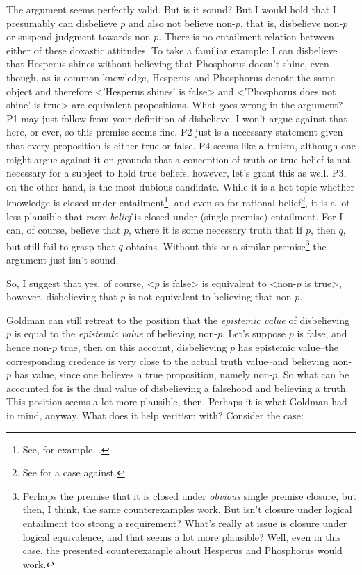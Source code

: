 \documentclass[12pt,numbers=noenddot]{scrartcl}
\begin{document}
The argument seems perfectly valid. But is it sound? But I would hold that I presumably can disbelieve $p$ and also not believe non-$p$, that is, disbelieve non-$p$ or suspend judgment towards non-$p$. There is no entailment relation between either of these doxastic attitudes. To take a familiar example: I can disbelieve that Hesperus shines without believing that Phosphorus doesn't shine, even though, as is common knowledge, Hesperus and Phosphorus denote the same object and therefore <'Hesperus shines' is false> and <'Phosphorus does not shine' is true> are equivalent propositions. What goes wrong in the argument? P1 may just follow from your definition of disbelieve. I won't argue against that here, or ever, so this premise seems fine. P2 just is a necessary statement given that every proposition is either true or false. P4 seems like a truism, although one might argue against it on grounds that a conception of truth or true belief is not necessary for a subject to hold true beliefs, however, let's grant this as well. P3, on the other hand, is the most dubious candidate. While it is a hot topic whether knowledge is closed under entailment\footnote{See, for example, \textcite{Dretske2005-DREIKC}.}, and even so for rational belief\footnote{See \textcite{KyburgJr1970-KYBC-2} for a case against.}, it is a lot less plausible that \emph{mere belief} is closed under (single premise) entailment. For I can, of course, believe that $p$, where it is some necessary truth that If $p$, then $q$, but still fail to grasp that $q$ obtains. Without this or a similar premise\footnote{Perhaps the premise that it is closed under \emph{obvious} single premise closure, but then, I think, the same counterexamples work. But isn't closure under logical entailment too strong a requirement? What's really at issue is closure under logical equivalence, and that seems a lot more plausible? Well, even in this case, the presented counterexample about Hesperus and Phosphorus would work.} the argument just isn't sound.

So, I suggest that yes, of course, <$p$ is false> is equivalent to <non-$p$ is true>, however, disbelieving that $p$ is not equivalent to believing that non-$p$.

Goldman can still retreat to the position that the \emph{epistemic value} of disbelieving $p$ is equal to the \emph{epistemic value} of believing non-$p$. Let's suppose $p$ is false, and hence non-$p$ true, then on this account, disbelieving $p$ has epistemic value–the corresponding credence is very close to the actual truth value–and believing non-$p$ has value, since one believes a true proposition, namely non-$p$. So what can be accounted for is the dual value of disbelieving a falsehood and believing a truth. This position seems a lot more plausible, then. Perhaps it is what Goldman had in mind, anyway. What does it help veritism with? Consider the case:
\end{document}
